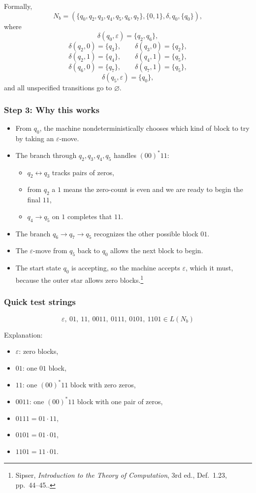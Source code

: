 \documentclass[12pt]{article}
\newcommand{\sipser}[1]{\footnote{Sipser, \emph{Introduction to the Theory of Computation}, 3rd ed., #1.}}
\begin{document}
Formally,
\[
N_b=(\{q_0,q_2,q_3,q_4,q_5,q_6,q_7\},\{0,1\},\delta,q_0,\{q_0\}),
\]
where
\[
\delta(q_0,\varepsilon)=\{q_2,q_6\},
\]
\[
\delta(q_2,0)=\{q_3\}, \qquad \delta(q_3,0)=\{q_2\},
\]
\[
\delta(q_2,1)=\{q_4\}, \qquad \delta(q_4,1)=\{q_5\},
\]
\[
\delta(q_6,0)=\{q_7\}, \qquad \delta(q_7,1)=\{q_5\},
\]
\[
\delta(q_5,\varepsilon)=\{q_0\},
\]
and all unspecified transitions go to \(\varnothing\).

\subsubsection*{Step 3: Why this works}

\begin{itemize}[itemsep=0.4em]
    \item From \(q_0\), the machine nondeterministically chooses which kind of block to try by taking an \(\varepsilon\)-move.
    \item The branch through \(q_2,q_3,q_4,q_5\) handles \((00)^*11\):
    \begin{itemize}
        \item \(q_2 \leftrightarrow q_3\) tracks pairs of zeros,
        \item from \(q_2\) a \(1\) means the zero-count is even and we are ready to begin the final \(11\),
        \item \(q_4 \to q_5\) on \(1\) completes that \(11\).
    \end{itemize}
    \item The branch \(q_6 \to q_7 \to q_5\) recognizes the other possible block \(01\).
    \item The \(\varepsilon\)-move from \(q_5\) back to \(q_0\) allows the next block to begin.
    \item The start state \(q_0\) is accepting, so the machine accepts \(\varepsilon\), which it must, because the outer star allows zero blocks.\sipser{Def.~1.23, pp.~44--45.}
\end{itemize}

\subsubsection*{Quick test strings}

\[
\varepsilon,\ 01,\ 11,\ 0011,\ 0111,\ 0101,\ 1101 \in L(N_b)
\]

Explanation:
\begin{itemize}[itemsep=0.3em]
    \item \(\varepsilon\): zero blocks,
    \item \(01\): one \(01\) block,
    \item \(11\): one \((00)^*11\) block with zero zeros,
    \item \(0011\): one \((00)^*11\) block with one pair of zeros,
    \item \(0111 = 01 \cdot 11\),
    \item \(0101 = 01 \cdot 01\),
    \item \(1101 = 11 \cdot 01\).
\end{itemize}
\end{document}
